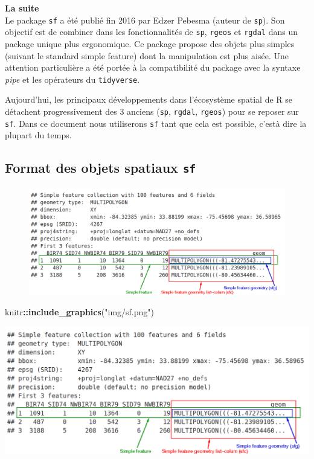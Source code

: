 \documentclass[]{book}
\newenvironment{Shaded}{\begin{snugshade}}{\end{snugshade}}
\newcommand{\KeywordTok}[1]{\textcolor[rgb]{0.13,0.29,0.53}{\textbf{#1}}}
\newcommand{\StringTok}[1]{\textcolor[rgb]{0.31,0.60,0.02}{#1}}
\newcommand{\OperatorTok}[1]{\textcolor[rgb]{0.81,0.36,0.00}{\textbf{#1}}}
\newcommand{\NormalTok}[1]{#1}
\begin{document}
\textbf{La suite}\\
Le package \texttt{sf} a été publié fin 2016 par Edzer Pebesma (auteur
de \texttt{sp}). Son objectif est de combiner dans les fonctionnalités
de \texttt{sp}, \texttt{rgeos} et \texttt{rgdal} dans un package unique
plus ergonomique. Ce package propose des objets plus simples (suivant le
standard simple feature) dont la manipulation est plus aisée. Une
attention particulière a été portée à la compatibilité du package avec
la syntaxe \emph{pipe} et les opérateurs du \texttt{tidyverse}.

Aujourd'hui, les principaux développements dans l'écosystème spatial de
R se détachent progressivement des 3 anciens (\texttt{sp},
\texttt{rgdal}, \texttt{rgeos}) pour se reposer sur \texttt{sf}. Dans ce
document nous utiliserons \texttt{sf} tant que cela est possible, c'està
dire la plupart du temps.

\subsection{\texorpdfstring{Format des objets spatiaux
\texttt{sf}}{Format des objets spatiaux sf}}\label{format-des-objets-spatiaux-sf}

\begin{figure}
\centering
\includegraphics{img/sf.png}
\caption{}
\end{figure}

\begin{Shaded}
\begin{Highlighting}[]
\NormalTok{knitr}\OperatorTok{::}\KeywordTok{include_graphics}\NormalTok{(}\StringTok{"img/sf.png"}\NormalTok{)}
\end{Highlighting}
\end{Shaded}

\begin{center}\includegraphics[width=15.6in]{img/sf} \end{center}
\end{document}

